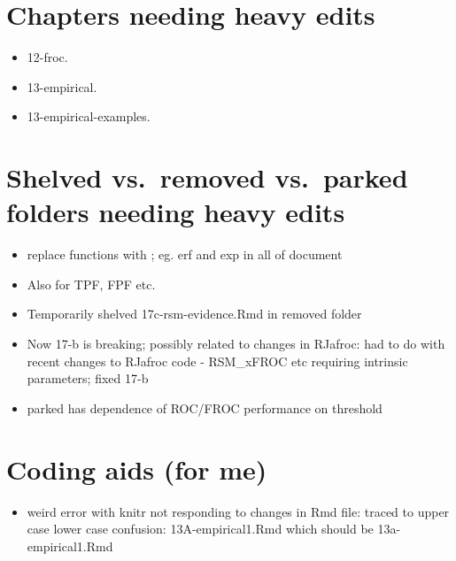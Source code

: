 \documentclass[
]{book}
\providecommand{\tightlist}{%
  \setlength{\itemsep}{0pt}\setlength{\parskip}{0pt}}
\begin{document}
\hypertarget{chapters-needing-heavy-edits}{%
\section*{Chapters needing heavy edits}\label{chapters-needing-heavy-edits}}

\begin{itemize}
\tightlist
\item
  12-froc.
\item
  13-empirical.
\item
  13-empirical-examples.
\end{itemize}

\hypertarget{shelved-vs.-removed-vs.-parked-folders-needing-heavy-edits}{%
\section*{Shelved vs.~removed vs.~parked folders needing heavy edits}\label{shelved-vs.-removed-vs.-parked-folders-needing-heavy-edits}}

\begin{itemize}
\tightlist
\item
  replace functions with \text{}; eg. erf and exp in all of document
\item
  Also for TPF, FPF etc.
\item
  Temporarily shelved 17c-rsm-evidence.Rmd in removed folder
\item
  Now 17-b is breaking; possibly related to changes in RJafroc: had to do with recent changes to RJafroc code - RSM\_xFROC etc requiring intrinsic parameters; fixed 17-b
\item
  parked has dependence of ROC/FROC performance on threshold
\end{itemize}

\hypertarget{coding-aids-for-me}{%
\section*{Coding aids (for me)}\label{coding-aids-for-me}}

\begin{itemize}
\tightlist
\item
  weird error with knitr not responding to changes in Rmd file: traced to upper case lower case confusion: 13A-empirical1.Rmd which should be 13a-empirical1.Rmd
\end{itemize}
\end{document}
